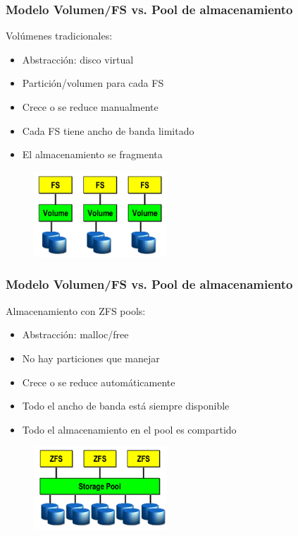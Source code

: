 \documentclass{beamer}
\begin{document}
\begin{frame}
  \frametitle{Modelo Volumen/FS vs. Pool de almacenamiento}

Volúmenes tradicionales:

  \begin{itemize}
    \item Abstracción: disco virtual 
    \item Partición/volumen para cada FS      
    \item Crece o se reduce manualmente
    \item Cada FS tiene ancho de banda limitado
    \item El almacenamiento se fragmenta 
  \end{itemize}

\begin{figure}[h]
\begin{center}
  \includegraphics[width=5cm]{figs/volumes2.png}
\end{center}
\end{figure}

\end{frame}


\begin{frame}
  \frametitle{Modelo Volumen/FS vs. Pool de almacenamiento}

Almacenamiento con ZFS pools:

  \begin{itemize}
    \item Abstracción: malloc/free
    \item No hay particiones que manejar
    \item Crece o se reduce automáticamente
    \item Todo el ancho de banda está siempre disponible 
    \item Todo el almacenamiento en el pool es compartido 
  \end{itemize}
\begin{figure}[h]
\begin{center}
  \includegraphics[width=5cm]{figs/pools.png}
\end{center}
\end{figure}

\end{frame}
\end{document}
